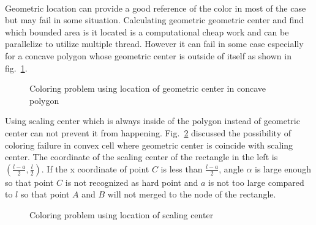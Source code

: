 \paragraph{}
Geometric location can provide a good reference of the color in most of the case but may fail in some situation.
Calculating geometric geometric center and find which bounded area is it located is a computational cheap work and can be parallelize to utilize multiple thread.
However it can fail in some case especially for a concave polygon whose geometric center is outside of itself as shown in fig.~\ref{qdt_fig:qdt_coloring_geo_problem}.
\begin{figure}[h!]
    \centering
    \caption[Coloring problem using location of geometric center in concave polygon]{Coloring problem using location of geometric center in concave polygon}
    \label{qdt_fig:qdt_coloring_geo_problem}
\end{figure}

Using scaling center which is always inside of the polygon instead of geometric center can not prevent it from happening.
Fig.~\ref{qdt_fig:qdt_coloring_geo_problem_sc} discussed the possibility of coloring failure in convex cell where geometric center is coincide with scaling center.
The coordinate of the scaling center of the rectangle in the left is $(\frac{l-a}{2},\frac{l}{2})$.
If the x coordinate of point $C$ is less than $\frac{l-a}{2}$, angle $\alpha$ is large enough so that point $C$ is not recognized as hard point and $a$ is not too large compared to $l$ so that point $A$ and $B$ will not merged to the node of the rectangle.

    \begin{figure}[h!]
        \centering
        \caption[Coloring problem using location of scaling center]{Coloring problem using location of scaling center}
        \label{qdt_fig:qdt_coloring_geo_problem_sc}
    \end{figure}

